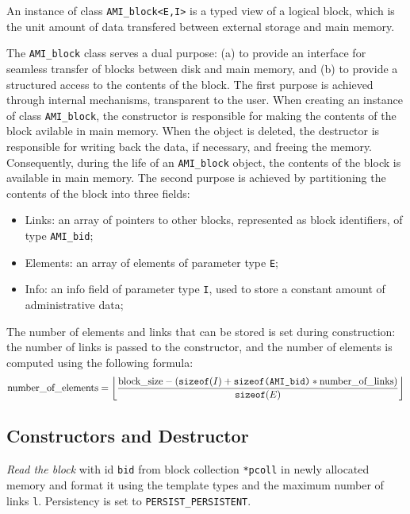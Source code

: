 An instance of class \lstinline|AMI_block<E,I>| is a typed
view of a logical block, which is the unit amount of data transfered
between external storage and main memory. 

The \lstinline|AMI_block| class serves a dual purpose: (a) to provide an
interface for seamless transfer of blocks between disk and main memory,
and (b) to provide a structured access to the contents of the block.
The first purpose is achieved through internal mechanisms, transparent
to the user. When creating an instance of class \lstinline|AMI_block|, the
constructor is responsible for making the contents of the block
avilable in main memory. When the object is deleted, the destructor is
responsible for writing back the data, if necessary, and freeing the
memory. Consequently, during the life of an \lstinline|AMI_block| object, the
contents of the block is available in main memory.
The second purpose is achieved by partitioning the contents of the block
into three fields:
\begin{itemize}
\item[] Links: an array of pointers to other blocks, represented as
block identifiers, of type \lstinline|AMI_bid|;
\item[] Elements: an array of elements of parameter type \lstinline|E|;
\item[] Info: an info field of parameter type \lstinline|I|, used to store a 
constant amount of administrative data;
\end{itemize}

The number of elements and links that can be stored is set during
construction: the number of links is passed to the constructor, and the
number of elements is computed using the following formula:
\[\mbox{\rm number\_of\_elements} = \left\lfloor\frac{\mbox{\rm
block\_size} - (\mbox{\tt sizeof}(I) + \mbox{\tt sizeof(AMI\_bid)} *
\mbox{\rm number\_of\_links})}{\mbox{\tt sizeof}(E)}\right\rfloor \]

\subsection{Constructors and Destructor}

   \btabb 

         {{\em Read the block} with id \lstinline|bid| from block collection
        \lstinline|*pcoll| in newly allocated memory and format it using the
        template types and the maximum number of links \lstinline|l|. Persistency
        is set to \lstinline|PERSIST_PERSISTENT|.}

